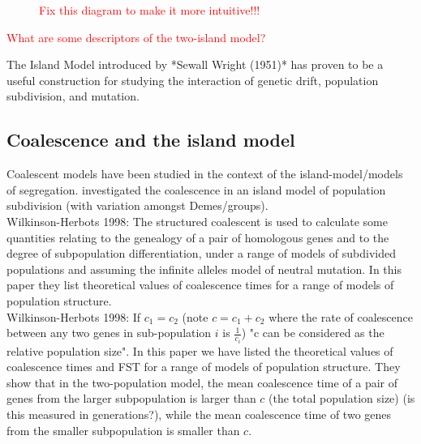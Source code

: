 \documentclass[12pt,a4paper]{article}
\begin{document}
\begin{figure}[H]
\centering
{}
\label{island_state_diagram}
\caption{\textcolor{red}{Fix this diagram to make it more intuitive!!!}}
\end{figure}

\textcolor{red}{What are some descriptors of the two-island model?}


The Island Model introduced by *Sewall Wright (1951)* has proven to be a useful construction for studying the interaction of genetic drift, population subdivision, and mutation. 

\subsection{Coalescence and the island model}
Coalescent models have been studied in the context of the island-model/models of segregation. \cite{wakeley2001coalescent} investigated the coalescence in an island model of population subdivision (with variation amongst Demes/groups). \\

Wilkinson-Herbots 1998: The structured coalescent is used to calculate some quantities relating to the genealogy of a pair of homologous genes and to the degree of subpopulation differentiation, under a range of models of subdivided populations and assuming the infinite alleles model of neutral mutation. In this paper they list theoretical values of coalescence times for a range of models of population structure. \\

Wilkinson-Herbots 1998: If $c_1=c_2$ (note $c=c_1+c_2$ where the rate of coalescence between any two genes in sub-population $i$ is $\frac{1}{c_i}$) "c can be considered as the relative population size". In this paper we have listed the theoretical values of coalescence times and FST for a range of models of population structure. They show that in the two-population model, the mean coalescence time of a pair of genes from the larger subpopulation is larger than $c$ (the total population size) (is this measured in generations?), while the mean coalescence time of two genes from the smaller subpopulation is smaller than $c$.
\end{document}
